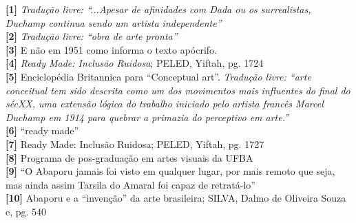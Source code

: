 \textbf{[1]} \emph{Tradução livre: “...Apesar de afinidades com Dada ou os surrealistas, Duchamp continua sendo um artista independente”}
\\
\textbf{[2]} \emph{Tradução livre: “obra de arte pronta”}
\\
\textbf{[3]} E não em 1951 como informa o texto apócrifo.
\\
\textbf{[4]} \emph{Ready Made: Inclusão Ruidosa}; PELED, Yiftah, pg. 1724
\\
\textbf{[5]} Enciclopédia Britannica para “Conceptual art”. \emph{Tradução livre: “arte conceitual tem sido descrita como um dos movimentos mais influentes do final do sécXX, uma extensão lógica do trabalho iniciado pelo artista francês Marcel Duchamp em 1914 para quebrar a primazia do perceptivo em arte.”}
\\
\textbf{[6]} “ready made”
\\
\textbf{[7]} Ready Made: Inclusão Ruidosa; PELED, Yiftah, pg. 1727
\\
\textbf{[8]} Programa de pos-graduação em artes visuais da UFBA
\\
\textbf{[9]} “O Abaporu jamais foi visto em qualquer lugar, por mais remoto que seja, mas ainda assim Tarsila do Amaral foi capaz de retratá-lo”
\\
\textbf{[10]} Abaporu e a “invenção” da arte brasileira; SILVA, Dalmo de Oliveira Souza e, pg. 540